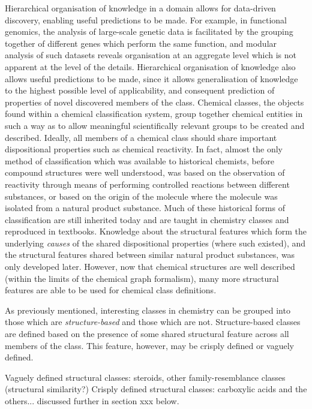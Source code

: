 \documentclass[10pt]{bmc_article}
\newenvironment{bmcformat}{\baselineskip20pt\sloppy\setboolean{publ}{false}}{\baselineskip20pt\sloppy}
\begin{document}
\begin{bmcformat}
Hierarchical organisation of knowledge in a domain allows for data-driven discovery, enabling useful predictions to be made.  For example, in functional genomics, the analysis of large-scale genetic data is facilitated by the grouping together of different genes which perform the same function, and modular analysis of such datasets reveals organisation at an aggregate level which is not apparent at the level of the details. Hierarchical organisation of knowledge also allows useful predictions to be made, since it allows generalisation of knowledge to the highest possible level of applicability, and consequent prediction of properties of novel discovered members of the class.  Chemical classes, the objects found within a chemical classification system, group together chemical entities in such a way as to allow meaningful scientifically relevant groups to be created and described. Ideally, all members of a chemical class should share important dispositional properties such as chemical reactivity. In fact, almost the only method of classification which was available to historical chemists, before compound structures were well understood, was based on the observation of reactivity through means of performing controlled reactions between different substances, or based on the origin of the molecule where the molecule was isolated from a natural product substance. Much of these historical forms of classification are still inherited today and are taught in chemistry classes and reproduced in textbooks. Knowledge about the structural features which form the underlying \textit{causes} of the shared dispositional properties (where such existed), and the structural features shared between similar natural product substances, was only developed later. However, now that chemical structures are well described (within the limits of the chemical graph formalism), many more structural features are able to be used for chemical class definitions. 

As previously mentioned, interesting classes in chemistry can be grouped into those which are \textit{structure-based} and those which are not. Structure-based classes are defined based on the presence of some shared structural feature across all members of the class.  This feature, however, may be crisply defined or vaguely defined.  

Vaguely defined structural classes:  steroids, other family-resemblance classes (structural similarity?)
Crisply defined structural classes:  carboxylic acids and the others... discussed further in section xxx below. 


\end{bmcformat}
\end{document}
